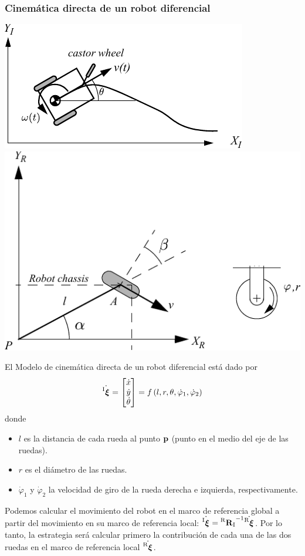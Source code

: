 \begin{frame}
    \frametitle{Cinemática directa de un robot diferencial}
    \scriptsize
    \begin{center}
        {
            \includegraphics[width=0.2\columnwidth]{./images/differential_drive.pdf}
        }
        {
            \includegraphics[width=0.15\columnwidth]{./images/wheel_parameters.pdf}
        }
    \end{center}
    El Modelo de cinemática directa de un robot diferencial está dado por
    \begin{equation*}
        \dot{\prescript{\mathrm{I}}{}{{\boldsymbol{\mathbf{\xi}}}_\mathrm{}}} =
        \begin{bmatrix}
            \dot{x}\\
            \dot{y}\\
            \dot{\theta}
        \end{bmatrix} =
        f\left( l,r,\theta,\dot{\varphi}_{1},\dot{\varphi}_{2}\right)
    \end{equation*}
    donde
    \begin{itemize}
        \item $l$ es la distancia de cada rueda al punto $\boldsymbol{\mathbf{p}}$ (punto en el medio del eje de las ruedas).
        \item $r$ es el diámetro de las ruedas.
        \item $\dot{\varphi}_{1}$ y $\dot{\varphi}_{2}$ la velocidad de giro de la rueda derecha e izquierda, respectivamente.
    \end{itemize}
    Podemos calcular el movimiento del robot en el marco de referencia global a partir del movimiento en su marco de referencia local:  $\dot{\prescript{\mathrm{I}}{}{{\boldsymbol{\mathbf{\xi}}}_\mathrm{}}} = {\prescript{\mathrm{R}}{}{{\boldsymbol{\mathbf{R}}}_\mathrm{I}}}^{-1}\dot{\prescript{\mathrm{R}}{}{{\boldsymbol{\mathbf{\xi}}}_\mathrm{}}}$. Por lo tanto, la estrategia será calcular primero la contribución de cada una de las dos ruedas en el marco de referencia local $\dot{\prescript{\mathrm{R}}{}{{\boldsymbol{\mathbf{\xi}}}_\mathrm{}}}$.
\end{frame}

